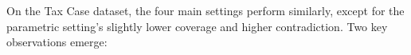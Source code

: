 




On the Tax Case dataset, the four main settings perform similarly, except for the parametric setting's slightly lower coverage and higher contradiction. Two key observations emerge:

